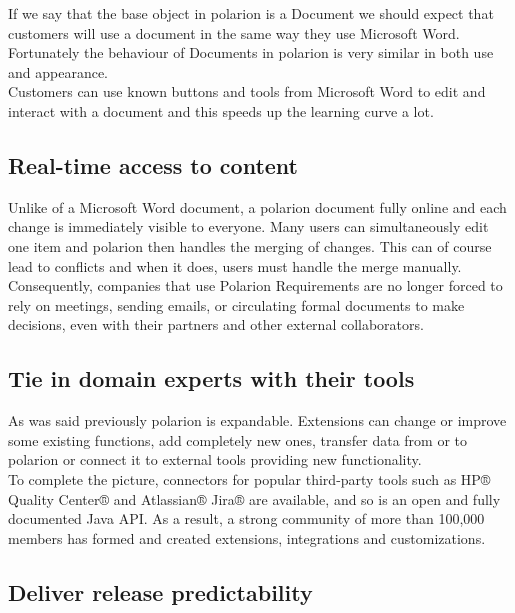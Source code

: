 \documentclass[thesis=M,english]{FITthesis}[2012/06/26]
\begin{document}
If we say that the base object in \acrshort{polarion} is a Document we should expect that customers will use a document in the same way they use Microsoft Word. Fortunately the behaviour of Documents in \acrshort{polarion} is very similar in both use and appearance.\\

Customers can use known buttons and tools from Microsoft Word to edit and interact with a document and this speeds up the learning curve a lot. 

\subsection{Real-time access to content}

Unlike of a Microsoft Word document, a \acrshort{polarion} document fully online and each change is immediately visible to everyone. Many users can simultaneously edit one item and \acrshort{polarion} then handles the merging of changes. This can of course lead to conflicts and when it does, users must handle the merge manually.\\ 

Consequently, companies that use Polarion Requirements are no longer forced to rely on meetings, sending emails, or circulating formal documents to make decisions, even with their partners and other external collaborators.

\subsection{Tie in domain experts with their tools}

As was said previously \acrshort{polarion} is expandable. Extensions can change or improve some existing functions, add completely new ones, transfer data from or to \acrshort{polarion} or connect it to external tools providing new functionality.\\

To complete the picture, connectors for popular third-party tools such as HP® Quality Center® and Atlassian® Jira® are available, and so is an open and fully documented Java API. As a result, a strong community of more than 100,000 members has formed and created extensions, integrations and customizations.

\subsection{Deliver release predictability}
\end{document}
